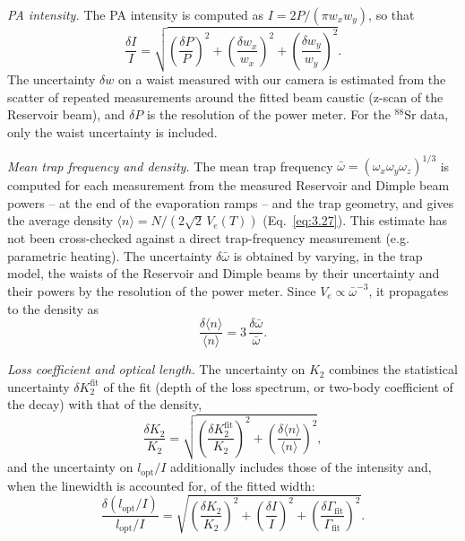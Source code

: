 \textit{PA intensity.} The PA intensity is computed as $I=2P/(\pi w_xw_y)$, so that
\begin{equation}
\frac{\delta I}{I}=\sqrt{\left(\frac{\delta P}{P}\right)^2+\left(\frac{\delta w_x}{w_x}\right)^2+\left(\frac{\delta w_y}{w_y}\right)^2}.
\end{equation}
The uncertainty $\delta w$ on a waist measured with our camera is estimated from the scatter
of repeated measurements around the fitted beam caustic (z-scan of the Reservoir beam), and
$\delta P$ is the resolution of the power meter. For the $^{88}\text{Sr}$ data, only the waist
uncertainty is included.

\textit{Mean trap frequency and density.} The mean trap frequency
$\bar\omega=(\omega_x\omega_y\omega_z)^{1/3}$ is computed for each measurement from the measured
Reservoir and Dimple beam powers -- at the end of the evaporation ramps -- and the trap geometry, and gives the average density
$\langle n\rangle=N/(2\sqrt{2}\,V_e(T))$ (Eq.~\ref{eq:3.27}). This estimate has not been
cross-checked against a direct trap-frequency measurement (e.g. parametric heating).
The uncertainty $\delta\bar\omega$ is obtained by varying, in the trap model, the waists of the
Reservoir and Dimple beams by their uncertainty and their powers by the resolution of the
power meter. Since $V_e\propto\bar\omega^{-3}$, it propagates to the density as
\begin{equation}
\frac{\delta\langle n\rangle}{\langle n\rangle}=3\,\frac{\delta\bar\omega}{\bar\omega}.
\end{equation}

\textit{Loss coefficient and optical length.} The uncertainty on $K_2$ combines the
statistical uncertainty $\delta K_2^{\text{fit}}$ of the fit (depth of the loss spectrum, or
two-body coefficient of the decay) with that of the density,
\begin{equation}
\frac{\delta K_2}{K_2}=\sqrt{\left(\frac{\delta K_2^{\text{fit}}}{K_2}\right)^2+\left(\frac{\delta\langle n\rangle}{\langle n\rangle}\right)^2},
\end{equation}
and the uncertainty on $l_{\text{opt}}/I$ additionally includes those of the intensity and,
when the linewidth is accounted for, of the fitted width:
\begin{equation}
\frac{\delta(l_{\text{opt}}/I)}{l_{\text{opt}}/I}=\sqrt{\left(\frac{\delta K_2}{K_2}\right)^2+\left(\frac{\delta I}{I}\right)^2+\left(\frac{\delta\Gamma_{\text{fit}}}{\Gamma_{\text{fit}}}\right)^2}.
\end{equation}


